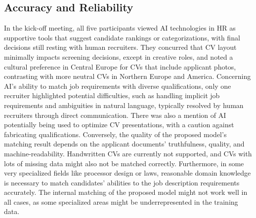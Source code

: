 \documentclass[draft,final]{thesisclass} %
\begin{document}
\subsection{Accuracy and Reliability}
In the kick-off meeting, all five participants viewed \acs{AI} technologies in \acs{HR} as supportive tools that suggest candidate rankings or categorizations, with final decisions still resting with human recruiters. They concurred that \acs{CV} layout minimally impacts screening decisions, except in creative roles, and noted a cultural preference in Central Europe for \acs{CV}s that include applicant photos, contrasting with more neutral \acs{CV}s in Northern Europe and America. Concerning \acs{AI}'s ability to match job requirements with diverse qualifications, only one recruiter highlighted potential difficulties, such as handling implicit job requirements and ambiguities in natural language, typically resolved by human recruiters through direct communication. There was also a mention of \acs{AI} potentially being used to optimize \acs{CV} presentations, with a caution against fabricating qualifications. Conversely, the quality of the proposed model's matching result depends on the applicant documents' truthfulness, quality, and machine-readability. Handwritten \acs{CV}s are currently not supported, and \acs{CV}s with lots of missing data might also not be matched correctly. Furthermore, in some very specialized fields like processor design or laws, reasonable domain knowledge is necessary to match candidates' abilities to the job description requirements accurately. The internal matching of the proposed model might not work well in all cases, as some specialized areas might be underrepresented in the training data.
\end{document}
